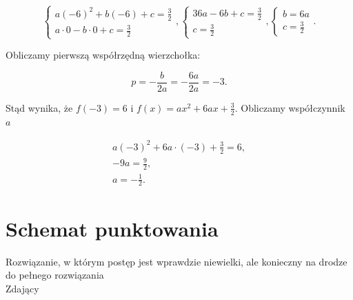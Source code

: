 \documentclass[10pt]{article}
\begin{document}
$$
\left\{\begin{array}{l}
a(-6)^{2}+b(-6)+c=\frac{3}{2} \\
a \cdot 0-b \cdot 0+c=\frac{3}{2}
\end{array},\left\{\begin{array}{l}
36 a-6 b+c=\frac{3}{2} \\
c=\frac{3}{2}
\end{array},\left\{\begin{array}{l}
b=6 a \\
c=\frac{3}{2}
\end{array} .\right.\right.\right.
$$

Obliczamy pierwszą współrzędną wierzchołka:

$$
p=-\frac{b}{2 a}=-\frac{6 a}{2 a}=-3 .
$$

Stąd wynika, że $f(-3)=6$ i $f(x)=a x^{2}+6 a x+\frac{3}{2}$. Obliczamy współczynnik $a$

$$
\begin{gathered}
a(-3)^{2}+6 a \cdot(-3)+\frac{3}{2}=6, \\
-9 a=\frac{9}{2}, \\
a=-\frac{1}{2} .
\end{gathered}
$$

\section*{Schemat punktowania}
Rozwiązanie, w którym postęp jest wprawdzie niewielki, ale konieczny na drodze do pełnego rozwiązania\\
Zdający
\end{document}
